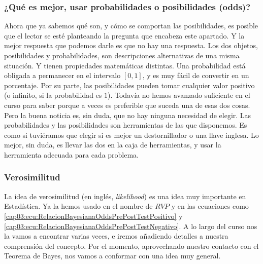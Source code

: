 \subsubsection{¿Qué es mejor, usar probabilidades o posibilidades (odds)?}
\label{cap03:subsubsec:QueEsMejorPosibilidadesProabilidades}

Ahora que ya sabemos qué son, y cómo se comportan las posibilidades, es posible que el lector se esté planteando la pregunta que encabeza este apartado. Y la mejor respuesta que podemos darle es que no hay una respuesta. Los dos objetos, posibilidades y probabilidades, son descripciones alternativas de una misma situación. Y tienen propiedades matemáticas distintas. Una probabilidad está obligada a permanecer en el intervalo $[0,1]$, y es muy fácil de convertir en un porcentaje. Por su parte, las posibilidades pueden tomar cualquier valor positivo (o infinito, si la probabilidad es $1$). Todavía no hemos avanzado suficiente en el curso para saber porque a veces es preferible que suceda una de esas dos cosas. Pero la buena noticia es, sin duda, que no hay ninguna necesidad de elegir. Las probabilidades y las posibilidades son herramientas de las que disponemos. Es como si tuviéramos que elegir si es mejor un destornillador o una llave inglesa. Lo mejor, sin duda, es llevar las dos en la caja de herramientas, y usar la herramienta adecuada para cada problema.

\subsubsection{Verosimilitud}
\label{cap03:subsubsec:verosimilitud}

La idea de {\sf verosimilitud} (en inglés, {\em likelihood}) es una idea muy importante en Estadística. Ya la hemos usado en el nombre de $RVP$ y en las ecuaciones como \ref{cap03:ecu:RelacionBayesianaOddsPrePostTestPositivo} y \ref{cap03:ecu:RelacionBayesianaOddsPrePostTestNegativo}.  A lo largo del curso nos la vamos a encontrar varias veces, e iremos añadiendo detalles a nuestra comprensión del concepto. Por el momento, aprovechando nuestro contacto con el Teorema de Bayes, nos vamos a conformar con una idea muy general.

